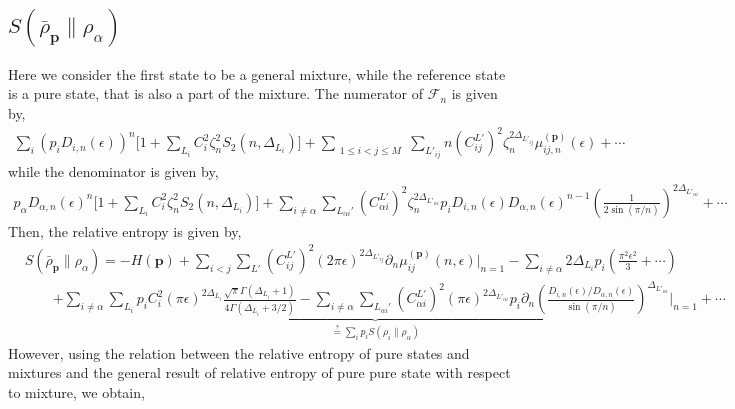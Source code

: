 \documentclass[11pt]{article}
\newcommand{\ep}{\epsilon}
\newcommand{\p}{\partial}
\newcommand{\nn}{\nonumber}
\newcommand{\lb}{\left(}
\newcommand{\rb}{\right)}
\begin{document}
\subsection{\texorpdfstring{$S(\bar{\rho}_\textbf{p}\| \rho_\alpha)$}{S rho bar p wrt rho alpha}}
Here we consider the first state to be a general mixture, while the reference state is a pure state, that is also a part of the mixture. 
The numerator of $\mathcal{F}_n$ is given by,
\begin{align}
     \sum_i  \lb p_iD_{i,n}(\ep)\rb^n \big[  1+ \sum_{L_i}C_i^2 \zeta_n^2 S_2(n,\Delta_{L_i})\big] + \displaystyle\sum_{\substack{1\leq i<j\leq M}}\sum_{L'_{ij}}n\lb C_{ij}^{L'}\rb^2\zeta_n^{2\Delta_{L'_{ij}}} \mu_{ij,n}^{(\textbf{p})}(\ep)  +\cdots 
\end{align}
while the denominator is given by,
\begin{align}
     p_\alpha D_{\alpha,n}(\ep)^n\big[  1+ \sum_{L_i}C_i^2 \zeta_n^2 S_2(n,\Delta_{L_i})\big] + \displaystyle\sum_{i\neq \alpha}\sum_{L_{\alpha i}'}\lb C_{\alpha i}^{L'}\rb^2\zeta_n^{2\Delta_{L'_{\alpha i}}}p_i D_{i,n}(\ep)D_{\alpha,n}(\ep)^{n-1}\lb  \frac{1}{2\sin (\pi/n)} \rb^{2\Delta_{L'_{\alpha i}}}  +\cdots
\end{align}
Then, the relative entropy is given by,
\begin{align}
    &S(\bar{\rho}_\textbf{p}\| \rho_\alpha) = -H(\textbf{p})+\sum_{i<j}\sum_{L'} \lb C_{ij}^{L'}\rb^2(2\pi \ep)^{2\Delta_{L'_{ij}}} \p_n  \mu_{ij}^{(\textbf{p})}(n,\ep)\Big|_{n=1} - \sum_{i\neq \alpha} 2\Delta_{L_i}p_i \lb \frac{\pi^2 \ep^2}{3}+\cdots \rb \nn \\ &\qquad \underbrace{+\sum_{i\neq \alpha}\sum_{L_i}p_i C_i^2 (\pi\ep)^{2\Delta_{L_i}} \frac{\sqrt\pi \Gamma(\Delta_{L_i}+1)}{4\Gamma(\Delta_{L_i}+ 3/2)} - \sum_{i\neq \alpha}\sum_{L_{\alpha i}'}\lb C_{\alpha i}^{L'}\rb^2\lb\pi\ep\rb^{2\Delta_{L'_{\alpha i}}}p_i \p_n \lb   \frac{D_{i,n}(\ep)/D_{\alpha,n}(\ep)}{\sin (\pi/n)} \rb^{\Delta_{L'_{\alpha i}}}\Bigg|_{n=1}}_{\overset{?}{=}\sum_ip_iS(\rho_i\|\rho_\alpha)}+\cdots
\end{align}
However, using the relation between the relative entropy of pure states and mixtures and the general result of relative entropy of pure pure state with respect to mixture, we obtain,
\end{document}
